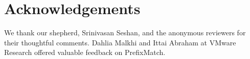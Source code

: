 
\section*{Acknowledgements}
We thank our shepherd, Srinivasan Seshan, and the anonymous reviewers for their thoughtful comments. Dahlia Malkhi and Ittai Abraham at VMware Research offered valuable feedback on PrefixMatch.